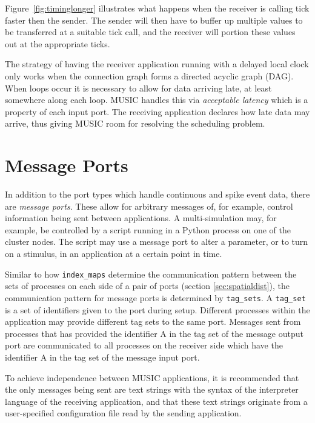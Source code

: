 \documentclass[a4paper]{report}
\begin{document}
Figure~\ref{fig:timinglonger} illustrates what happens when the
receiver is calling tick faster then the sender.  The sender will then
have to buffer up multiple values to be transferred at a suitable tick
call, and the receiver will portion these values out at the
appropriate ticks.

The strategy of having the receiver application running with a delayed
local clock only works when the connection graph forms a directed
acyclic graph (DAG).
When loops occur it is necessary to allow for data arriving late, at
least somewhere along each loop.  MUSIC handles this via
\emph{acceptable latency}
which is a property of each input port.  The receiving application
declares how late data may arrive, thus giving MUSIC room for
resolving the scheduling problem.


\section{Message Ports}

In addition to the port types which handle continuous and spike event
data, there are \emph{message ports}.  These allow for arbitrary
messages of, for example, control information being sent between
applications.  A multi-simulation may, for example, be controlled by a
script running in a Python process on one of the cluster nodes.  The
script may use a message port to alter a parameter, or to turn on a
stimulus, in an application at a certain point in time.

Similar to how \lstinline|index_maps| determine the communication
pattern between the sets of processes on each side of a pair of ports
(section \ref{sec:spatialdist}), the communication pattern for message
ports is determined by \lstinline|tag_sets|.  A \lstinline|tag_set| is
a set of identifiers given to the port during setup.  Different
processes within the application may provide different tag sets to the
same port.  Messages sent from processes that has provided the
identifier A in the tag set of the message output port are
communicated to all processes on the receiver side which have the
identifier A in the tag set of the message input port.

To achieve independence between MUSIC applications, it is recommended
that the only messages being sent are text strings with the syntax of
the interpreter language of the receiving application, and that these
text strings originate from a user-specified configuration file read
by the sending application.
\end{document}

